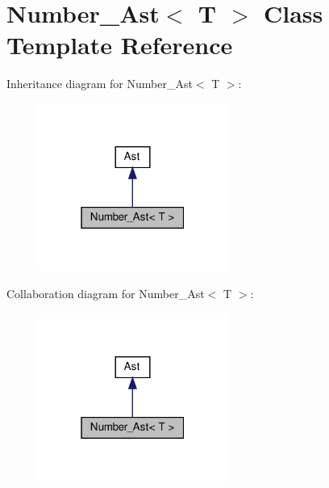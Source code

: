 \hypertarget{classNumber__Ast}{}\section{Number\+\_\+\+Ast$<$ T $>$ Class Template Reference}
\label{classNumber__Ast}


Inheritance diagram for Number\+\_\+\+Ast$<$ T $>$\+:
\nopagebreak
\begin{figure}[H]
\begin{center}
\leavevmode
\includegraphics[width=175pt]{classNumber__Ast__inherit__graph}
\end{center}
\end{figure}


Collaboration diagram for Number\+\_\+\+Ast$<$ T $>$\+:
\nopagebreak
\begin{figure}[H]
\begin{center}
\leavevmode
\includegraphics[width=175pt]{classNumber__Ast__coll__graph}
\end{center}
\end{figure}

